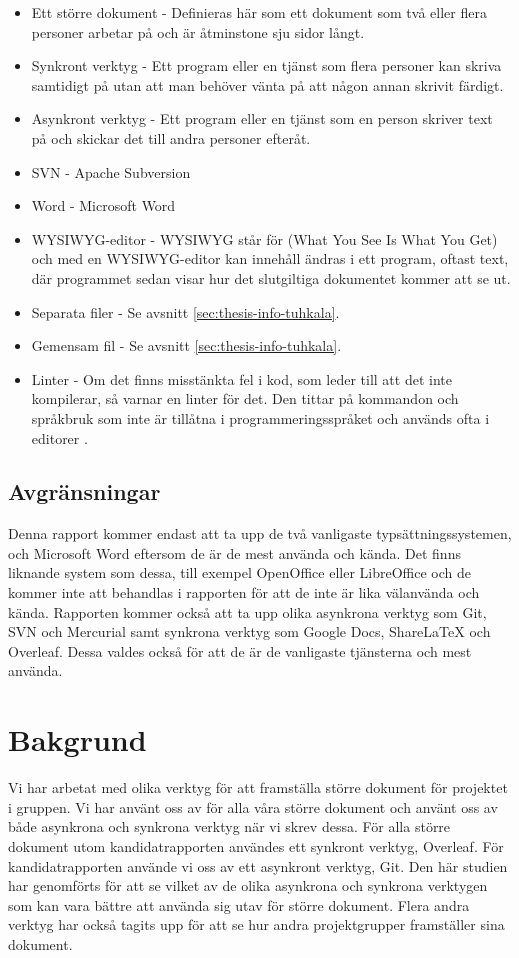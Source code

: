 \begin{itemize}
	\item Ett större dokument - Definieras här som ett dokument som två eller flera personer arbetar på och är åtminstone sju sidor långt.
	\item Synkront verktyg - Ett program eller en tjänst som flera personer kan skriva samtidigt på utan att man behöver vänta på att någon annan skrivit färdigt.
	\item Asynkront verktyg - Ett program eller en tjänst som en person skriver text på och skickar det till andra personer efteråt.
	\item SVN - Apache Subversion
	\item Word - Microsoft Word
	\item WYSIWYG-editor - WYSIWYG står för (What You See Is What You Get) och med en WYSIWYG-editor kan innehåll ändras i ett program, oftast text, där programmet sedan visar hur det slutgiltiga dokumentet kommer att se ut.
	\item Separata filer - Se avsnitt \ref{sec:thesis-info-tuhkala}.
	\item Gemensam fil - Se avsnitt \ref{sec:thesis-info-tuhkala}.
	\item Linter - Om det finns misstänkta fel i kod, som leder till att det inte kompilerar, så varnar en linter för det. Den tittar på kommandon och språkbruk som inte är tillåtna i programmeringsspråket och används ofta i editorer \cite{linter}.
\end{itemize}

\subsection{Avgränsningar}
Denna rapport kommer endast att ta upp de två vanligaste typsättningssystemen, \latex och Microsoft Word eftersom de är de mest använda och kända. Det finns liknande system som dessa, till exempel OpenOffice eller LibreOffice och de kommer inte att behandlas i rapporten för att de inte är lika välanvända och kända. Rapporten kommer också att ta upp olika asynkrona verktyg som Git, SVN och Mercurial samt synkrona verktyg som Google Docs, ShareLaTeX och Overleaf. Dessa valdes också för att de är de vanligaste tjänsterna och mest använda.

\section{Bakgrund}
\label{sec:background-tuhkala}
Vi har arbetat med olika verktyg för att framställa större dokument för projektet i gruppen. Vi har använt oss av \latex för alla våra större dokument och använt oss av både asynkrona och synkrona verktyg när vi skrev dessa. För alla större dokument utom kandidatrapporten användes ett synkront verktyg, Overleaf. För kandidatrapporten använde vi oss av ett asynkront verktyg, Git. Den här studien har genomförts för att se vilket av de olika asynkrona och synkrona verktygen som kan vara bättre att använda sig utav för större dokument. Flera andra verktyg har också tagits upp för att se hur andra projektgrupper framställer sina dokument. 

